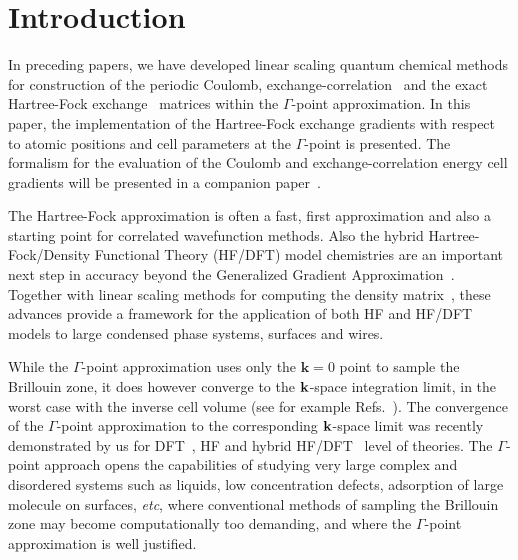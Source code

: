 \documentclass[prl,twocolumn,showpacs,twocolumngrid,superbib]{revtex4}
\begin{document}
\section{Introduction}

In preceding papers, we have developed linear scaling quantum chemical methods
for construction of the periodic Coulomb, exchange-correlation~\cite{CTymczak04a}
and the exact Hartree-Fock exchange~\cite{CTymczak04b} 
matrices within the $\Gamma$-point approximation. 
In this paper, the implementation of the Hartree-Fock exchange
gradients with respect to atomic positions and cell parameters
at the $\Gamma$-point is presented. 
The formalism for the evaluation of the Coulomb and 
exchange-correlation energy cell gradients will be presented 
in a companion paper~\cite{CTymczak05}.

The Hartree-Fock approximation is often a fast, first approximation and 
also a starting point for correlated wavefunction methods.
Also the hybrid Hartree-Fock/Density Functional Theory (HF/DFT) model chemistries
are an important next step in accuracy beyond the Generalized Gradient 
Approximation~\cite{Gill92,Becke93,VBarone96,CAdamo99}. Together with linear
scaling methods for computing the density matrix~\cite{ANiklasson02A,ANiklasson03}, these
advances provide a framework for the application of both HF and HF/DFT 
models to large condensed phase systems, surfaces and wires.

While the $\Gamma$-point approximation uses only the $\mathbf{k}=0$ point to sample
the Brillouin zone, it does however converge to the 
${\bf k}$-space integration limit, in the worst case with the inverse  
cell volume (see for example Refs.~\cite{CKittel71,NAshcroft76}).
The convergence of the $\Gamma$-point approximation to 
the corresponding ${\bf k}$-space limit was recently 
demonstrated by us for DFT~\cite{CTymczak04a}, HF and hybrid 
HF/DFT~\cite{CTymczak04b} level of theories.
The $\Gamma$-point approach opens the capabilities of studying very large 
complex and disordered systems such as liquids, low concentration defects, adsorption of 
large molecule on surfaces, {\em etc}, where conventional methods 
of sampling the Brillouin zone may become computationally too demanding, and
where the $\Gamma$-point approximation is well justified.
\end{document}
